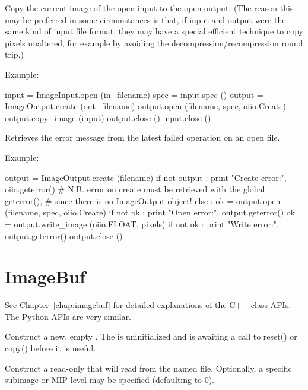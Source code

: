 Copy the current image of the open input to the open output. (The reason
this may be preferred in some circumstances is that, if input and
output were the same kind of input file format, they may have a special
efficient technique to copy pixels unaltered, for example by avoiding the 
decompression/recompression round trip.)

\noindent Example:
\begin{code}
    input = ImageInput.open (in_filename)
    spec = input.spec ()
    output = ImageOutput.create (out_filename)
    output.open (filename, spec, oiio.Create)
    output.copy_image (input)
    output.close ()
    input.close ()
\end{code}
\apiend

Retrieves the error message from the latest failed operation on an open
file.

\noindent Example:
\begin{code}
    output = ImageOutput.create (filename)
    if not output :
        print "Create error:", oiio.geterror()
        # N.B. error on create must be retrieved with the global geterror(),
        # since there is no ImageOutput object!
    else :
        ok = output.open (filename, spec, oiio.Create)
        if not ok :
            print "Open error:", output.geterror()
        ok = output.write_image (oiio.FLOAT, pixels)
        if not ok :
            print "Write error:", output.geterror()
        output.close ()
\end{code}
\apiend



\section{ImageBuf}
\label{sec:pythonimagebuf}

See Chapter~\ref{chap:imagebuf} for detailed explanations of the
C++ \ImageBuf class APIs. The Python APIs are very similar.

Construct a new, empty \ImageBuf. The \ImageBuf is uninitialized and is
awaiting a call to {\cf reset()} or {\cf copy()} before it is useful.
\apiend


Construct a read-only \ImageBuf that will read from the named file.
Optionally, a specific subimage or MIP level may be specified (defaulting to
0).

